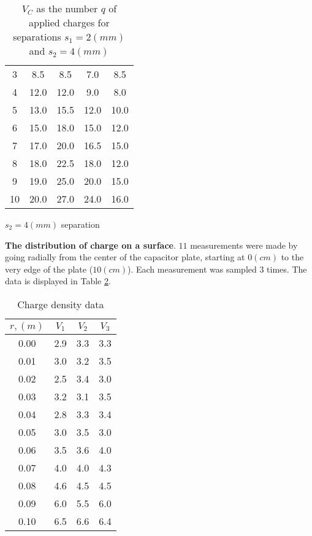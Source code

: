 \begin{table}[H]
\begin{minipage}{0.4\textwidth}
\begin{tabular}{|c|cccc|}
            3   & 8.5  & 8.5  & 7.0  & 8.5  \\
            4   & 12.0 & 12.0 & 9.0  & 8.0  \\
            5   & 13.0 & 15.5 & 12.0 & 10.0 \\
            6   & 15.0 & 18.0 & 15.0 & 12.0 \\
            7   & 17.0 & 20.0 & 16.5 & 15.0 \\
            8   & 18.0 & 22.5 & 18.0 & 12.0 \\
            9   & 19.0 & 25.0 & 20.0 & 15.0 \\
            10  & 20.0 & 27.0 & 24.0 & 16.0 \\
            \hline
        \end{tabular}
        \caption{$s_2=4 (mm)$ separation}
    \end{minipage}

    \caption{$V_C$ as the number $q$ of applied charges for separations $s_1 = 2 (mm)$ and $s_2 = 4(mm)$}
    \label{tab:appendix:data:exp1}
\end{table}

\textbf{The distribution of charge on a surface}. $11$ measurements were made by going radially from the center of the capacitor plate, starting at $0 (cm)$ to the very edge of the plate ($10 (cm)$). Each measurement was sampled $3$ times. The data is displayed in Table \ref{tab:appendix:data:exp2}.
\begin{table}[H]
    \centering
    \begin{tabular}{|c|ccc|}
        \hline
         $r, (m)$ & $V_1$ & $V_2$ & $V_3$ \\
         \hline
         0.00 & 2.9 & 3.3 & 3.3 \\
         0.01 & 3.0 & 3.2 & 3.5 \\
         0.02 & 2.5 & 3.4 & 3.0 \\
         0.03 & 3.2 & 3.1 & 3.5 \\
         0.04 & 2.8 & 3.3 & 3.4 \\
         0.05 & 3.0 & 3.5 & 3.0 \\
         0.06 & 3.5 & 3.6 & 4.0 \\
         0.07 & 4.0 & 4.0 & 4.3 \\
         0.08 & 4.6 & 4.5 & 4.5 \\
         0.09 & 6.0 & 5.5 & 6.0 \\
         0.10 & 6.5 & 6.6 & 6.4 \\
         \hline
    \end{tabular}
    \caption{Charge density data}
    \label{tab:appendix:data:exp2}
\end{table}

